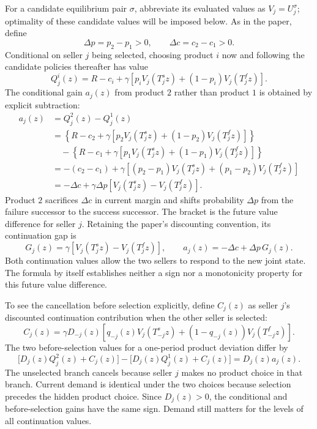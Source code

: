 \documentclass[11pt]{article}
\begin{document}
For a candidate equilibrium pair $\sigma$, abbreviate its evaluated
values as $V_j=U_j^\sigma$; optimality of these candidate values will
be imposed below. As in the paper, define
\begin{equation}\label{eq:increments}
\Delta p=p_2-p_1>0,\qquad \Delta c=c_2-c_1>0.
\end{equation}
Conditional on seller $j$ being selected, choosing product $i$ now and
following the candidate policies thereafter has value
\begin{equation}\label{eq:conditional-q}
Q_j^i(z)=R-c_i+\gamma\left[
p_iV_j(T_j^s z)+(1-p_i)V_j(T_j^f z)\right].
\end{equation}
The conditional gain $a_j(z)$ from product $2$ rather than product $1$
is obtained by explicit subtraction:
\begin{equation}\label{eq:gain}
\begin{aligned}
a_j(z)&=Q_j^2(z)-Q_j^1(z)\\
&=\left\{R-c_2+\gamma[p_2V_j(T_j^s z)+(1-p_2)V_j(T_j^f z)]\right\}\\
&\quad-\left\{R-c_1+\gamma[p_1V_j(T_j^s z)+(1-p_1)V_j(T_j^f z)]\right\}\\
&=-(c_2-c_1)+\gamma\left[(p_2-p_1)V_j(T_j^s z)
+(p_1-p_2)V_j(T_j^f z)\right]\\
&=-\Delta c+\gamma\Delta p
\left[V_j(T_j^s z)-V_j(T_j^f z)\right].
\end{aligned}
\end{equation}
Product $2$ sacrifices $\Delta c$ in current margin and shifts
probability $\Delta p$ from the failure successor to the success
successor. The bracket is the future value difference for seller $j$.
Retaining the paper's discounting convention, its continuation gap is
\begin{equation}\label{eq:gap}
G_j(z)=\gamma\left[V_j(T_j^s z)-V_j(T_j^f z)\right],
\qquad a_j(z)=-\Delta c+\Delta p\,G_j(z).
\end{equation}
Both continuation values allow the two sellers to respond to the new
joint state. The formula by itself establishes neither a sign nor a
monotonicity property for this future value difference.

To see the cancellation before selection explicitly, define $C_j(z)$
as seller $j$'s discounted continuation contribution when the other
seller is selected:
\begin{equation*}
C_j(z)=\gamma D_{-j}(z)\left[
q_{-j}(z)V_j(T_{-j}^s z)+(1-q_{-j}(z))V_j(T_{-j}^f z)\right].
\end{equation*}
The two before-selection values for a one-period product deviation
differ by
\begin{equation}\label{eq:unselected-cancellation}
\bigl[D_j(z)Q_j^2(z)+C_j(z)\bigr]
-\bigl[D_j(z)Q_j^1(z)+C_j(z)\bigr]=D_j(z)a_j(z).
\end{equation}
The unselected branch cancels because seller $j$ makes no product
choice in that branch. Current demand is identical under the two
choices because selection precedes the hidden product choice. Since
$D_j(z)>0$, the conditional and before-selection gains have the same
sign. Demand still matters for the levels of all continuation values.
\end{document}
